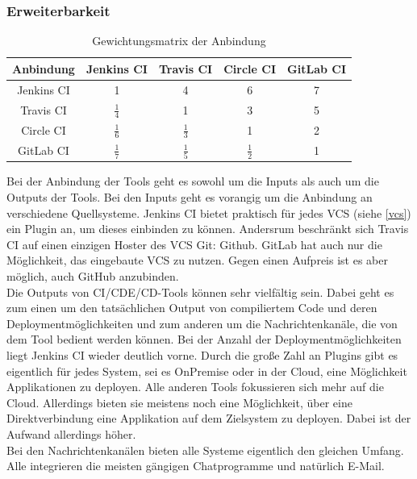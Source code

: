 \subsubsection{Erweiterbarkeit}
\begin{table}[h!]
	\centering
	\begin{tabular}{c|cccc}
		Anbindung  & Jenkins CI		 & Travis CI& Circle CI & GitLab CI   \\ 
		\hline
		Jenkins CI      & 1     		      &        4        &      6       &      7     \\
		Travis CI &   $\frac{1}{4}$     & 1               &  3& 5     \\
		Circle CI   &   $\frac{1}{6}$     &  $\frac{1}{3}$   & 1            & 2  \\
		GitLab CI    &    $\frac{1}{7}$    &  $\frac{1}{5}$   &  $\frac{1}{2}$ & 1           \\
	\end{tabular}
	\caption{Gewichtungsmatrix der Anbindung}
\end{table}
Bei der Anbindung der Tools geht es sowohl um die Inputs als auch um die Outputs der Tools. Bei den Inputs geht es vorangig um die Anbindung an verschiedene Quellsysteme. Jenkins CI bietet praktisch für jedes VCS (siehe \ref{vcs}) ein Plugin an, um dieses einbinden zu können. Andersrum beschränkt sich Travis CI auf einen einzigen Hoster des VCS Git: Github. GitLab hat auch nur die Möglichkeit, das eingebaute VCS zu nutzen. Gegen einen Aufpreis ist es aber möglich, auch GitHub anzubinden.\\
Die Outputs von \ac{CI}/\ac{CDE}/\ac{CD}-Tools können sehr vielfältig sein. Dabei geht es zum einen um den tatsächlichen Output von compiliertem Code und deren Deploymentmöglichkeiten und zum anderen um die Nachrichtenkanäle, die von dem Tool bedient werden können. Bei der Anzahl der Deploymentmöglichkeiten liegt Jenkins CI wieder deutlich vorne. Durch die große Zahl an Plugins gibt es eigentlich für jedes System, sei es OnPremise oder in der Cloud, eine Möglichkeit Applikationen zu deployen. Alle anderen Tools fokussieren sich mehr auf die Cloud. Allerdings bieten sie meistens noch eine Möglichkeit, über eine Direktverbindung eine Applikation auf dem Zielsystem zu deployen. Dabei ist der Aufwand allerdings höher.\\
Bei den Nachrichtenkanälen bieten alle Systeme eigentlich den gleichen Umfang. Alle integrieren die meisten gängigen Chatprogramme und natürlich E-Mail.
